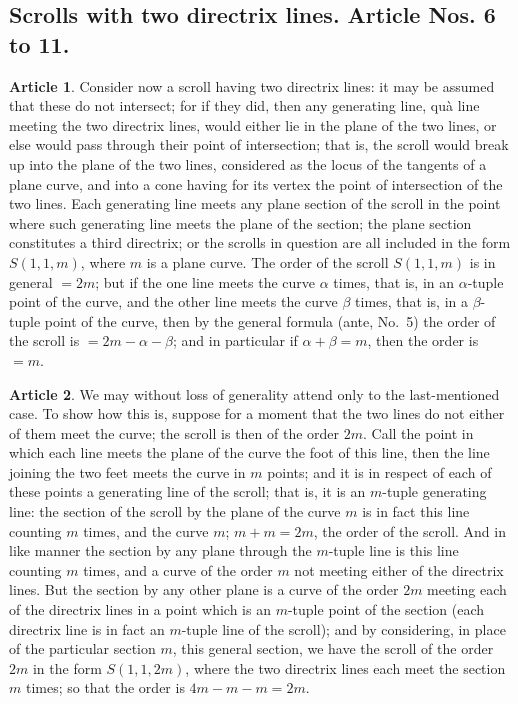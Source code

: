 \documentclass[12pt,a4paper]{article}
\theoremstyle{definition}
\newtheorem{art}{Article}[section]
\begin{document}
\subsection*{Scrolls with two directrix lines. Article Nos. 6 to 11.}

\begin{art}
Consider now a scroll having two directrix lines: it may be assumed that these do not intersect; for if they did, then any generating line, qu\`{a} line meeting the two directrix lines, would either lie in the plane of the two lines, or else would pass through their point of intersection; that is, the scroll would break up into the plane of the two lines, considered as the locus of the tangents of a plane curve, and into a cone having for its vertex the point of intersection of the two lines. Each generating line meets any plane section of the scroll in the point where such generating line meets the plane of the section; the plane section constitutes a third directrix; or the scrolls in question are all included in the form $S(1, 1, m)$, where $m$ is a plane curve. The order of the scroll $S(1, 1, m)$ is in general $= 2m$; but if the one line meets the curve $\alpha$ times, that is, in an $\alpha$-tuple point of the curve, and the other line meets the curve $\beta$ times, that is, in a $\beta$-tuple point of the curve, then by the general formula (ante, No.~5) the order of the scroll is $= 2m - \alpha - \beta$; and in particular if $\alpha + \beta = m$, then the order is $= m$.
\end{art}

\begin{art}
We may without loss of generality attend only to the last-mentioned case. To show how this is, suppose for a moment that the two lines do not either of them meet the curve; the scroll is then of the order $2m$. Call the point in which each line meets the plane of the curve the foot of this line, then the line joining the two feet meets the curve in $m$ points; and it is in respect of each of these points a generating line of the scroll; that is, it is an $m$-tuple generating line: the section of the scroll by the plane of the curve $m$ is in fact this line counting $m$ times, and the curve $m$; $m + m = 2m$, the order of the scroll. And in like manner the section by any plane through the $m$-tuple line is this line counting $m$ times, and a curve of the order $m$ not meeting either of the directrix lines. But the section by any other plane is a curve of the order $2m$ meeting each of the directrix lines in a point which is an $m$-tuple point of the section (each directrix line is in fact an $m$-tuple line of the scroll); and by considering, in place of the particular section $m$, this general section, we have the scroll of the order $2m$ in the form $S(1, 1, 2m)$, where the two directrix lines each meet the section $m$ times; so that the order is $4m - m - m = 2m$.
\end{art}
\end{document}
